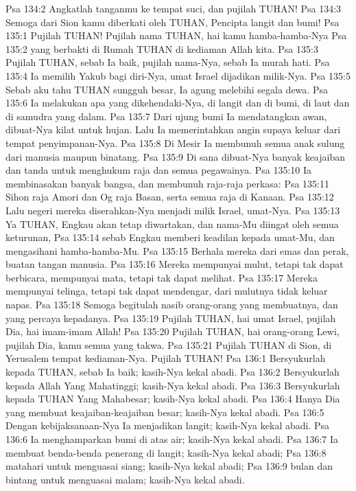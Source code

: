 Psa 134:2  Angkatlah tanganmu ke tempat suci, dan pujilah TUHAN!
Psa 134:3  Semoga dari Sion kamu diberkati oleh TUHAN, Pencipta langit dan bumi!
Psa 135:1  Pujilah TUHAN! Pujilah nama TUHAN, hai kamu hamba-hamba-Nya
Psa 135:2  yang berbakti di Rumah TUHAN di kediaman Allah kita.
Psa 135:3  Pujilah TUHAN, sebab Ia baik, pujilah nama-Nya, sebab Ia murah hati.
Psa 135:4  Ia memilih Yakub bagi diri-Nya, umat Israel dijadikan milik-Nya.
Psa 135:5  Sebab aku tahu TUHAN sungguh besar, Ia agung melebihi segala dewa.
Psa 135:6  Ia melakukan apa yang dikehendaki-Nya, di langit dan di bumi, di laut dan di samudra yang dalam.
Psa 135:7  Dari ujung bumi Ia mendatangkan awan, dibuat-Nya kilat untuk hujan. Lalu Ia memerintahkan angin supaya keluar dari tempat penyimpanan-Nya.
Psa 135:8  Di Mesir Ia membunuh semua anak sulung dari manusia maupun binatang.
Psa 135:9  Di sana dibuat-Nya banyak keajaiban dan tanda untuk menghukum raja dan semua pegawainya.
Psa 135:10  Ia membinasakan banyak bangsa, dan membunuh raja-raja perkasa:
Psa 135:11  Sihon raja Amori dan Og raja Basan, serta semua raja di Kanaan.
Psa 135:12  Lalu negeri mereka diserahkan-Nya menjadi milik Israel, umat-Nya.
Psa 135:13  Ya TUHAN, Engkau akan tetap diwartakan, dan nama-Mu diingat oleh semua keturunan,
Psa 135:14  sebab Engkau memberi keadilan kepada umat-Mu, dan mengasihani hamba-hamba-Mu.
Psa 135:15  Berhala mereka dari emas dan perak, buatan tangan manusia.
Psa 135:16  Mereka mempunyai mulut, tetapi tak dapat berbicara, mempunyai mata, tetapi tak dapat melihat.
Psa 135:17  Mereka mempunyai telinga, tetapi tak dapat mendengar, dari mulutnya tidak keluar napas.
Psa 135:18  Semoga begitulah nasib orang-orang yang membuatnya, dan yang percaya kepadanya.
Psa 135:19  Pujilah TUHAN, hai umat Israel, pujilah Dia, hai imam-imam Allah!
Psa 135:20  Pujilah TUHAN, hai orang-orang Lewi, pujilah Dia, kamu semua yang takwa.
Psa 135:21  Pujilah TUHAN di Sion, di Yerusalem tempat kediaman-Nya. Pujilah TUHAN!
Psa 136:1  Bersyukurlah kepada TUHAN, sebab Ia baik; kasih-Nya kekal abadi.
Psa 136:2  Bersyukurlah kepada Allah Yang Mahatinggi; kasih-Nya kekal abadi.
Psa 136:3  Bersyukurlah kepada TUHAN Yang Mahabesar; kasih-Nya kekal abadi.
Psa 136:4  Hanya Dia yang membuat keajaiban-keajaiban besar; kasih-Nya kekal abadi.
Psa 136:5  Dengan kebijaksanaan-Nya Ia menjadikan langit; kasih-Nya kekal abadi.
Psa 136:6  Ia menghamparkan bumi di atas air; kasih-Nya kekal abadi.
Psa 136:7  Ia membuat benda-benda penerang di langit; kasih-Nya kekal abadi;
Psa 136:8  matahari untuk menguasai siang; kasih-Nya kekal abadi;
Psa 136:9  bulan dan bintang untuk menguasai malam; kasih-Nya kekal abadi.

